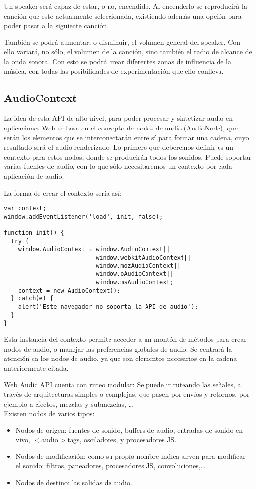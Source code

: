 Un speaker será capaz de estar, o no, encendido. Al encenderlo se reproducirá la canción que este actualmente seleccionada, existiendo además una opción para poder pasar a la siguiente canción.
 
También se podrá aumentar, o disminuir, el volumen general del speaker. Con ello variará, no sólo, el volumen de la canción, sino también el radio de alcance de la onda sonora. Con esto se podrá crear diferentes zonas de influencia de la música, con todas las posibilidades de experimentación que ello conlleva.


\subsection{AudioContext}
\label{sec:audio_context}
La idea de esta API de alto nivel, para poder procesar y sintetizar audio en aplicaciones Web se basa en el concepto de nodos de audio (AudioNode), que serán los elementos que se interconectarán entre sí para formar una cadena, cuyo resultado será el audio renderizado. Lo primero que deberemos definir es un contexto para estos nodos, donde se producirán todos los sonidos. Puede soportar varias fuentes de audio, con lo que sólo necesitaremos un contexto por cada aplicación de audio.

La forma de crear el contexto sería así:
\begin{verbatim}
var context;
window.addEventListener('load', init, false);

function init() {
  try {
    window.AudioContext = window.AudioContext||
                          window.webkitAudioContext||
                          window.mozAudioContext||
                          window.oAudioContext||
                          window.msAudioContext;
    context = new AudioContext();
  } catch(e) {
    alert('Este navegador no soporta la API de audio');
  }
}
\end{verbatim}

Esta instancia del contexto  permite acceder a un montón de métodos para crear nodos de audio, o manejar las preferencias globales de audio. Se centrará la atención en los nodos de audio, ya que son elementos necesarios en la cadena anteriormente citada.

Web Audio API cuenta con ruteo modular: Se puede ir ruteando las señales, a través de arquitecturas simples o complejas, que pasen por envíos y retornos, por ejemplo a efectos, mezclas y submezclas, …\\

Existen nodos de varios tipos:
\begin{itemize}
 \item Nodos de origen: fuentes de sonido, buffers de audio, entradas de sonido en vivo, $<$audio$>$tags, osciladores, y procesadores JS.
 \item Nodos de modificación: como su propio nombre indica sirven para modificar el sonido: filtros, paneadores, procesadores JS, convoluciones,…
 \item Nodos de destino: las salidas de audio.
\end{itemize}

